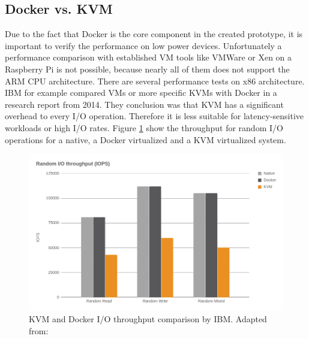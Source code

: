 \subsection{Docker vs. KVM}
Due to the fact that Docker is the core component in the created prototype, it is important to verify the performance on low power devices.
Unfortunately a performance comparison with established \ac{VM} tools like VMWare or Xen on a Raspberry Pi is not possible, because nearly all of them does not support the ARM \ac{CPU} architecture.
There are several performance tests on x86 architecture.
IBM for example compared \acp{VM} or more specific \acp{KVM} with Docker in a research report\autocite{IBM:Performance:2014} from 2014.
They conclusion was that \ac{KVM} has a significant overhead to every I/O operation.
Therefore it is less suitable for latency-sensitive workloads or high I/O rates.
Figure \ref{fig:ibm_kvm_docker_io} show the throughput for random I/O operations for a native, a Docker virtualized and a \ac{KVM} virtualized system.

\begin{figure}[H]
    \centering
    \includegraphics[width=\textwidth]{resources/images/performance_ibm_kvm_docker_io.png}
    \caption[KVM and Docker I/O throughput comparison by IBM]{KVM and Docker I/O throughput comparison by IBM. Adapted from: \autocite[p. 6]{IBM:Performance:2014}}
    \label{fig:ibm_kvm_docker_io}
\end{figure}

